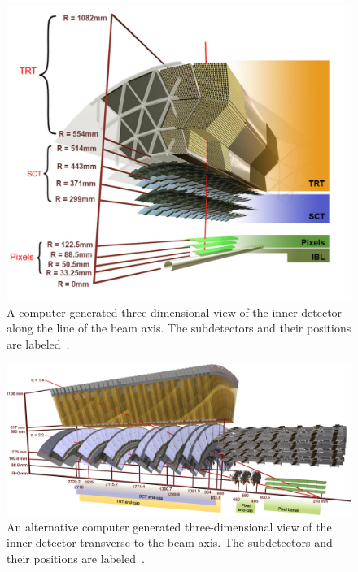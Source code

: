 \begin{figure}[hbtp]
\includegraphics[width=\fullfig]{figures/id_slice.png}
\caption{A computer generated three-dimensional view of the inner detector along the line of the beam axis. The subdetectors and their positions are labeled~\cite{atlas_experiment}.}
\label{fig:id_slice}
\end{figure}


\begin{figure}[hbtp]
\includegraphics[width=\fullfig]{figures/id_slice_long.pdf}
\caption{An alternative computer generated three-dimensional view of the inner detector transverse to the beam axis. The subdetectors and their positions are labeled~\cite{atlas_experiment}.}
\label{fig:id_slice_long}
\end{figure}

